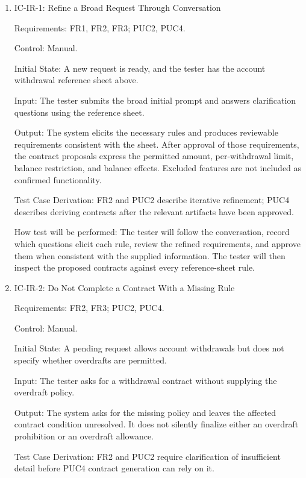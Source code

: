 \documentclass[12pt, titlepage]{article}
\begin{document}
\begin{enumerate}

\item{IC-IR-1: Refine a Broad Request Through Conversation\\}

Requirements: FR1, FR2, FR3; PUC2, PUC4.

Control: Manual.

Initial State: A new request is ready, and the tester has the account
withdrawal reference sheet above.

Input: The tester submits the broad initial prompt and answers clarification
questions using the reference sheet.

Output: The system elicits the necessary rules and produces reviewable
requirements consistent with the sheet. After approval of those requirements,
the contract proposals express the permitted amount, per-withdrawal limit,
balance restriction, and balance effects. Excluded features are not included
as confirmed functionality.

Test Case Derivation: FR2 and PUC2 describe iterative refinement; PUC4
describes deriving contracts after the relevant artifacts have been approved.

How test will be performed: The tester will follow the conversation, record
which questions elicit each rule, review the refined requirements, and approve
them when consistent with the supplied information. The tester will then
inspect the proposed contracts against every reference-sheet rule.

\item{IC-IR-2: Do Not Complete a Contract With a Missing Rule\\}

Requirements: FR2, FR3; PUC2, PUC4.

Control: Manual.

Initial State: A pending request allows account withdrawals but does not
specify whether overdrafts are permitted.

Input: The tester asks for a withdrawal contract without supplying the
overdraft policy.

Output: The system asks for the missing policy and leaves the affected
contract condition unresolved. It does not silently finalize either an
overdraft prohibition or an overdraft allowance.

Test Case Derivation: FR2 and PUC2 require clarification of insufficient
detail before PUC4 contract generation can rely on it.


\end{enumerate}
\end{document}
